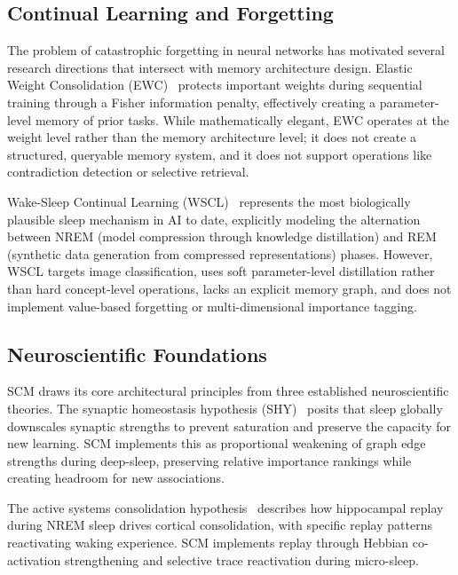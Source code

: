 \documentclass[11pt,twocolumn]{article}
\begin{document}
\subsection{Continual Learning and Forgetting}

The problem of catastrophic forgetting in neural networks has motivated several research directions that intersect with memory architecture design. Elastic Weight Consolidation (EWC)~\cite{kirkpatrick2017ewc} protects important weights during sequential training through a Fisher information penalty, effectively creating a parameter-level memory of prior tasks. While mathematically elegant, EWC operates at the weight level rather than the memory architecture level; it does not create a structured, queryable memory system, and it does not support operations like contradiction detection or selective retrieval.

Wake-Sleep Continual Learning (WSCL)~\cite{sorrenti2024wscl} represents the most biologically plausible sleep mechanism in AI to date, explicitly modeling the alternation between NREM (model compression through knowledge distillation) and REM (synthetic data generation from compressed representations) phases. However, WSCL targets image classification, uses soft parameter-level distillation rather than hard concept-level operations, lacks an explicit memory graph, and does not implement value-based forgetting or multi-dimensional importance tagging.

\subsection{Neuroscientific Foundations}

SCM draws its core architectural principles from three established neuroscientific theories. The synaptic homeostasis hypothesis (SHY)~\cite{tononi2003sleep} posits that sleep globally downscales synaptic strengths to prevent saturation and preserve the capacity for new learning. SCM implements this as proportional weakening of graph edge strengths during deep-sleep, preserving relative importance rankings while creating headroom for new associations.

The active systems consolidation hypothesis~\cite{rasch2013sleep} describes how hippocampal replay during NREM sleep drives cortical consolidation, with specific replay patterns reactivating waking experience. SCM implements replay through Hebbian co-activation strengthening and selective trace reactivation during micro-sleep.
\end{document}
